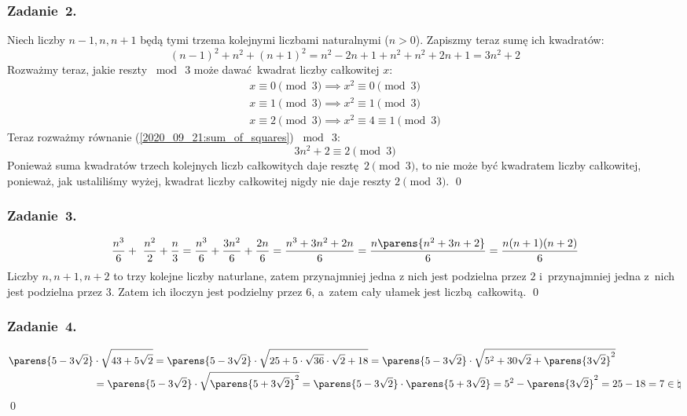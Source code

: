 \subsubsection*{Zadanie~2.}
Niech liczby \(n - 1, n, n + 1\) będą tymi trzema kolejnymi liczbami naturalnymi (\(n > 0\)). Zapiszmy teraz sumę ich kwadratów:
\begin{equation*}
    \tag{\(\star\)} (n - 1)^2 + n^2 + (n + 1)^2 = n^2 - 2n + 1 + n^2 + n^2 + 2n + 1 = 3n^2 + 2 \label{2020_09_21:sum_of_squares}
\end{equation*}
Rozważmy teraz, jakie reszty \(\bmod\ 3\) może dawać kwadrat liczby całkowitej \(x\):
\begin{gather*}
    x \equiv 0 \pmod{3} \implies x^2 \equiv 0 \pmod{3}\\
    x \equiv 1 \pmod{3} \implies x^2 \equiv 1 \pmod{3}\\
    x \equiv 2 \pmod{3} \implies x^2 \equiv 4 \equiv 1 \pmod{3}
\end{gather*}
Teraz rozważmy równanie (\ref{2020_09_21:sum_of_squares}) \(\bmod\ 3\):
\begin{equation*}
    3n^2 + 2 \equiv 2 \pmod{3}
\end{equation*}
Ponieważ suma kwadratów trzech kolejnych liczb całkowitych daje resztę \(2 \pmod{3}\), to nie może być kwadratem liczby całkowitej, ponieważ, jak ustaliliśmy wyżej, kwadrat liczby całkowitej nigdy nie daje reszty \(2 \pmod{3}\).
\qed
\subsubsection*{Zadanie~3.}
\begin{equation*}
    \frac{n^3}{6} + \frac{n^2}{2} + \frac{n}{3} = \frac{n^3}{6} + \frac{3n^2}{6} + \frac{2n}{6}
        = \frac{n^3 + 3n^2 + 2n}{6}
        = \frac{n \parens{n^2 + 3n + 2}}{6}
        = \frac{n(n + 1)(n + 2)}{6}
\end{equation*}
Liczby \(n, n + 1, n + 2\) to trzy kolejne liczby naturlane, zatem przynajmniej jedna z nich jest podzielna przez \(2\) i~przynajmniej jedna z~nich jest podzielna przez \(3\). Zatem ich iloczyn jest podzielny przez \(6\), a~zatem cały ułamek jest liczbą całkowitą.
\qed
\subsubsection*{Zadanie~4.}
\begin{equation*}
    \begin{split}
        \parens{5 - 3\sqrt{2}} &\cdot \sqrt{43 + 5\sqrt{2}} = \parens{5 - 3\sqrt{2}} \cdot \sqrt{25 + 5 \cdot \sqrt{36} \cdot \sqrt{2} + 18}
            = \parens{5 - 3\sqrt{2}} \cdot \sqrt{5^2 + 30\sqrt{2} + \parens{3\sqrt{2}}^2}\\
            &= \parens{5 - 3\sqrt{2}} \cdot \sqrt{\parens{5 + 3\sqrt{2}}^2}
            = \parens{5 - 3\sqrt{2}} \cdot \parens{5 + 3\sqrt{2}}
            = 5^2 - \parens{3\sqrt{2}}^2 = 25 - 18
            = 7 \in \natural
    \end{split}
\end{equation*}
\qed
